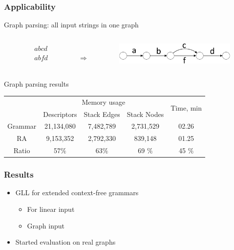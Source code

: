 \documentclass{beamer}
\begin{document}
	\begin{frame} 
		\frametitle{Applicability} 
		\begin{center}
		\vspace{-40pt}
		Graph parsing: all input strings in one graph
		\begin{columns}
			\begin{column}{1cm}
			\end{column}
			\begin{column}{1cm}
				\begin{center}
				$abcd$ \\ 
				$abfd$
				\end{center}
			\end{column}
			\begin{column}{.7cm}
				\\
				$ \Longrightarrow $
			\end{column}
			\begin{column}{6cm}
			\includegraphics[width=6cm]{pictures/graph.pdf}
			\end{column}
		\end{columns}
		\vspace{40pt}
		Graph parsing results
		\begin{tabular}{ | c | c | c | c | c | }
			\hline
			\multirow{2}{*}[-1ex]{} &\multicolumn{3}{c|}{Memory usage} & \multirow{2}{*}[-1ex]{Time, min } \\
			\cline{2-4}
			             &  Descriptors & Stack Edges & Stack Nodes &   \\ \hline
			Grammar  &  21,134,080       & 7,482,789      & 2,731,529      & 02.26  \\ \hline
			RA &  9,153,352        &  2,792,330     & 839,148        & 01.25  \\ \hline \hline
			Ratio   &  57$\%$       & 63$\%$     & 69 $\%$    &  45 $\%$ \\ \hline
		\end{tabular}
		\end{center}
	\end{frame}

	\begin{frame} 
		\frametitle{Results}
		\begin{itemize}
			\item GLL for extended context-free grammars
			\begin{itemize}
				\item For linear input
				\item Graph input			
			\end{itemize}
			\item Started evaluation on real graphs
		\end{itemize}
		
	\end{frame}
\end{document}
